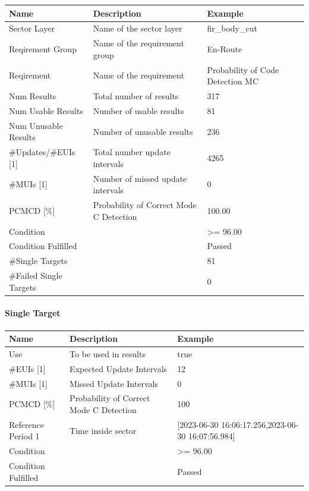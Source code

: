 \begin{center}
 \begin{table}[H]
  \begin{tabularx}{\textwidth}{ | l | X |  l | }
    \hline
    \textbf{Name} & \textbf{Description} & \textbf{Example} \\ \hline
    Sector Layer & Name of the sector layer & fir\_body\_cut \\ \hline
    Reqirement Group & Name of the requirement group & En-Route \\ \hline
    Reqirement & Name of the requirement & Probability of Code Detection MC \\ \hline
    Num Results & Total number of results & 317 \\ \hline
    Num Usable Results & Number of usable results & 81 \\ \hline
    Num Unusable Results & Number of unusable results & 236 \\ \hline
    \#Updates/\#EUIs [1] & Total number update intervals & 4265 \\ \hline
    \#MUIs [1] & Number of missed update intervals & 0 \\ \hline
    PCMCD [\%] & Probability of Correct Mode C Detection & 100.00 \\ \hline
    Condition &  & >= 96.00 \\ \hline
    Condition Fulfilled &  & Passed \\ \hline
    \#Single Targets &  & 81 \\ \hline
    \#Failed Single Targets &  & 0 \\ \hline
\end{tabularx}
\end{table}
\end{center}

\paragraph{Single Target}

\begin{center}
 \begin{table}[H]
  \begin{tabularx}{\textwidth}{ | l | X |  l | }
    \hline
    \textbf{Name} & \textbf{Description} & \textbf{Example} \\ \hline
    Use & To be used in results & true \\ \hline
    \#EUIs [1] & Expected Update Intervals & 12 \\ \hline
    \#MUIs [1] & Missed Update Intervals & 0 \\ \hline
    PCMCD [\%] & Probability of Correct Mode C Detection & 100 \\ \hline
    Reference Period 1 & Time inside sector & [2023-06-30 16:06:17.256,2023-06-30 16:07:56.984] \\ \hline
    Condition &  & >= 96.00 \\ \hline
    Condition Fulfilled &  & Passed \\ \hline
\end{tabularx}
\end{table}
\end{center}

